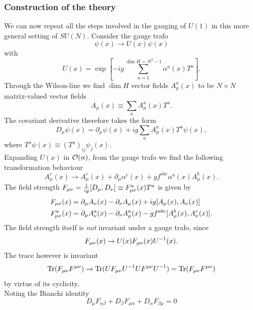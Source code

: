 \subsubsection{Construction of the theory}
We can now repeat all the steps involved in the gauging of $U(1)$ in this more general setting of $SU(N)$. Consider the gauge trafo
\begin{equation}
	\psi(x) \rightarrow U(x) \psi(x) 
\end{equation}
with 
\begin{equation}
	U(x) = \exp\left[-ig \sum_{a=1}^{\dim H=N^2-1} \alpha^a(x) T^a\right].
\end{equation}
Through the Wilson-line we find $\dim H$ vector fields $A^a_\mu(x)$ to be $N\times N$ matrix-valued vector fields
\begin{equation}
	A_\mu(x) \equiv \sum_a A^a_\mu(x) T^a.
\end{equation}
The covariant derivative therefore takes the form
\begin{equation}
	D_\mu \psi(x) = \partial_\mu \psi(x) + i g\sum_a A^a_\mu(x) T^a \psi(x),
\end{equation}
where $T^a \psi(x) \equiv (T^a)_{ij} \psi_j(x)$.\\
Expanding $U(x)$ in $\mathcal{O}(\alpha)$, from the gauge trafo we find the following transformation behaviour  
\begin{equation}
	A^c_\mu(x) \rightarrow A^c_\mu(x) + \partial_\mu \alpha^c(x) + g f^{abc} \alpha^a(x) A^b_\mu(x). 
\end{equation}
The field strength $F_{\mu \nu} = \frac{1}{i g} [D_\mu, D_\nu] \equiv F^a_{\mu \nu} (x) T^a$ is given by
\begin{align}
	F_{\mu \nu}(x) &= \partial_\mu A_\nu(x) - \partial_\nu A_\mu(x) + ig [A_\mu(x), A_\nu(x)] \\
	F^a_{\mu \nu}(x) &= \partial_\mu A^a_\nu(x) - \partial_\nu A^a_\mu(x) - g f^{abc} [A^b_\mu(x), A^c_\nu(x)].
\end{align}
The field strength itself is \emph{not} invariant under a gauge trafo, since
\begin{equation}
	F_{\mu \nu}(x) \rightarrow U(x) F_{\mu \nu}(x) U^{-1}(x).
\end{equation}
The trace however is invariant 
\begin{equation}
\mathrm{Tr}(F_{\mu \nu} F^{\mu \nu}) \rightarrow \mathrm{Tr}(UF_{\mu \nu} U^{-1} U F^{\mu \nu} U^{-1}) = \mathrm{Tr}(F_{\mu \nu} F^{\mu \nu})
\end{equation}
by virtue of its cyclicity.\\
Noting the Bianchi identity
\begin{equation}
	D_\mu F_{\alpha \beta} + D_\beta F_{\mu \alpha} + D_\alpha F_{\beta \mu} =0
\end{equation}
